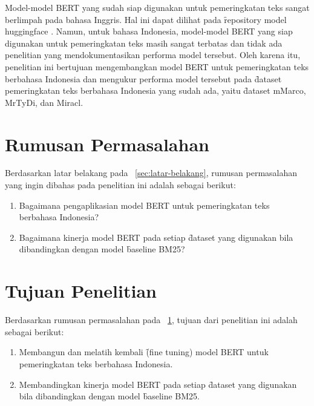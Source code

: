 Model-model BERT yang sudah siap digunakan untuk pemeringkatan teks sangat berlimpah pada bahasa Inggris. Hal ini dapat dilihat pada \f{repository} model huggingface \href{https://huggingface.co/sentence-transformers}{}. Namun, untuk bahasa Indonesia, model-model BERT yang siap digunakan untuk pemeringkatan teks masih sangat terbatas dan tidak ada penelitian yang mendokumentasikan performa model tersebut. Oleh karena itu, penelitian ini bertujuan mengembangkan model BERT untuk pemeringkatan teks berbahasa Indonesia dan mengukur performa model tersebut pada \f{dataset} pemeringkatan teks berbahasa Indonesia yang sudah ada, yaitu \f{dataset} mMarco, MrTyDi, dan Miracl.

\section{Rumusan Permasalahan}
\label{sec:rumusan-permasalahan}
Berdasarkan  latar belakang pada \sect~\ref{sec:latar-belakang}, rumusan permasalahan yang ingin dibahas pada penelitian ini adalah sebagai berikut:
\begin{enumerate}
	\item Bagaimana pengaplikasian model BERT untuk pemeringkatan teks berbahasa Indonesia?
	\item Bagaimana kinerja model BERT pada setiap \f{dataset} yang digunakan bila dibandingkan dengan model \f{baseline} BM25?
\end{enumerate}

\section{Tujuan Penelitian}
Berdasarkan rumusan permasalahan pada \sect~\ref{sec:rumusan-permasalahan}, tujuan dari penelitian ini adalah sebagai berikut:
\begin{enumerate}
	\item Membangun dan melatih kembali \f{(fine tuning)} model BERT untuk pemeringkatan teks berbahasa Indonesia.
	\item Membandingkan kinerja model BERT pada setiap \f{dataset} yang digunakan bila dibandingkan dengan model \f{baseline} BM25.
\end{enumerate}

